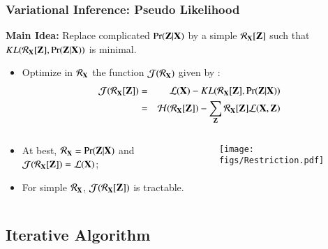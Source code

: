 \documentclass{beamer}
\newcommand{\Zbf}{{\bf Z}}
\newcommand{\Xbf}{{\bf X}}
\newcommand{\RX}{\mathcal{R}_{\Xbf}}
\begin{document}
\begin{frame}
  \frametitle{Variational Inference: Pseudo Likelihood}
  \textbf{Main Idea:} Replace \alert{complicated} $\Pr(\Zbf|\Xbf)$ by a \alert{simple} $\RX[\Zbf]$ such that
  $KL(\RX[\Zbf], \Pr(\Zbf|\Xbf))$ is minimal.\bigskip
  \pause
  \begin{itemize}
  \item Optimize in $\RX$ the function $\mathcal{J}(\RX)$ given by :
    \begin{eqnarray*}
      \mathcal{J}(\RX[\Zbf])  & = & \mathcal{L}(\Xbf)  - KL(\RX[\Zbf],
      \Pr(\Zbf|\Xbf)) \\
      & = & \mathcal{H}(\RX[\Zbf]) - \sum_{\Zbf} \RX[\Zbf]  \mathcal{L}(\Xbf,\Zbf)
    \end{eqnarray*}
  \end{itemize}
    \pause
  \begin{columns}
  \begin{column}{8cm}
  \begin{itemize}
  \item At best, $\RX = \Pr(\Zbf|\Xbf)$ and $\mathcal{J}(\RX[\Zbf])
    = \mathcal{L}(\Xbf)$;\bigskip
  \item For simple $\RX$, $\mathcal{J}(\RX[\Zbf])$ is tractable.
  \end{itemize}
  \end{column}
  \begin{column}{4cm}
    \begin{overprint}
    \texttt{[image: figs/Restriction.pdf]}
    \end{overprint}
  \end{column}
  \end{columns}
\end{frame}

\subsection{Iterative Algorithm}
\end{document}
